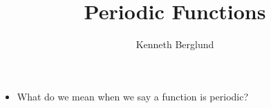 \documentclass[nooutcomes]{ximera}
\author{Kenneth Berglund}
\title{Periodic Functions}
\begin{document}
\licenseAPCSZCSCC
\begin{abstract}
  
\end{abstract}
\maketitle



\begin{motivatingQuestions}\begin{itemize}
\item What do we mean when we say a function is periodic?
\end{itemize}\end{motivatingQuestions}



%
%
%
%
\end{document}

